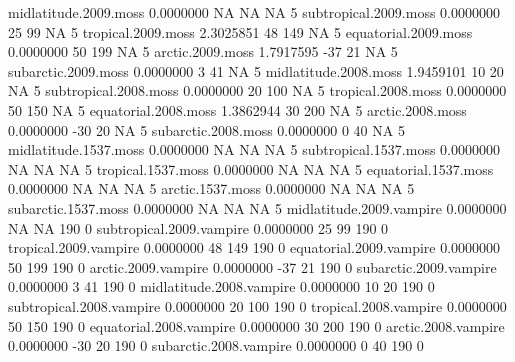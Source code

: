\documentclass{article}
\numberwithin{exercise}{section}
\begin{document}
\begin{Schunk}
\begin{Soutput}
midlatitude.2009.moss     0.0000000          NA            NA        NA              5
subtropical.2009.moss     0.0000000          25            99        NA              5
tropical.2009.moss        2.3025851          48           149        NA              5
equatorial.2009.moss      0.0000000          50           199        NA              5
arctic.2009.moss          1.7917595         -37            21        NA              5
subarctic.2009.moss       0.0000000           3            41        NA              5
midlatitude.2008.moss     1.9459101          10            20        NA              5
subtropical.2008.moss     0.0000000          20           100        NA              5
tropical.2008.moss        0.0000000          50           150        NA              5
equatorial.2008.moss      1.3862944          30           200        NA              5
arctic.2008.moss          0.0000000         -30            20        NA              5
subarctic.2008.moss       0.0000000           0            40        NA              5
midlatitude.1537.moss     0.0000000          NA            NA        NA              5
subtropical.1537.moss     0.0000000          NA            NA        NA              5
tropical.1537.moss        0.0000000          NA            NA        NA              5
equatorial.1537.moss      0.0000000          NA            NA        NA              5
arctic.1537.moss          0.0000000          NA            NA        NA              5
subarctic.1537.moss       0.0000000          NA            NA        NA              5
midlatitude.2009.vampire  0.0000000          NA            NA       190              0
subtropical.2009.vampire  0.0000000          25            99       190              0
tropical.2009.vampire     0.0000000          48           149       190              0
equatorial.2009.vampire   0.0000000          50           199       190              0
arctic.2009.vampire       0.0000000         -37            21       190              0
subarctic.2009.vampire    0.0000000           3            41       190              0
midlatitude.2008.vampire  0.0000000          10            20       190              0
subtropical.2008.vampire  0.0000000          20           100       190              0
tropical.2008.vampire     0.0000000          50           150       190              0
equatorial.2008.vampire   0.0000000          30           200       190              0
arctic.2008.vampire       0.0000000         -30            20       190              0
subarctic.2008.vampire    0.0000000           0            40       190              0

\end{Soutput}
\end{Schunk}
\end{document}
